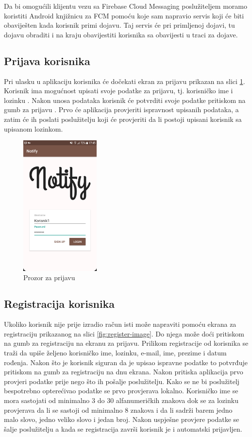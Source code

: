 \documentclass[times, utf8, zavrsni]{fer}
\begin{document}
{Da bi omogućili klijentu vezu sa Firebase Cloud Messaging poslužiteljem moramo koristiti Android knjižnicu za FCM pomoću koje sam napravio servis koji će biti obaviješten kada korisnik primi dojavu. Taj servis će pri primljenoj dojavi, tu dojavu obraditi i na kraju obavijestiti korisnika sa obavijesti u traci za dojave.

\subsection{Prijava korisnika}
Pri ulasku u aplikaciju korisnika će dočekati ekran za prijavu prikazan na slici \ref{fig:login-image}. Korisnik ima mogućnost upisati svoje podatke za prijavu, tj. korisničko ime  i lozinku . Nakon unosa podataka korisnik će potvrditi svoje podatke pritiskom na gumb za prijavu . Prvo će aplikacija provjeriti ispravnost upisanih podataka, a zatim će ih poslati poslužitelju koji će provjeriti da li postoji upisani korisnik sa upisanom lozinkom.

\begin{figure}[htb]
\centering
\includegraphics[width=4cm]{img/ss-login.png}
\caption{Prozor za prijavu}
\label{fig:login-image}
\end{figure}

\subsection{Registracija korisnika}
Ukoliko korisnik nije prije izradio račun isti može napraviti pomoću ekrana za registraciju prikazanog na slici \ref{fig:register-image}. Do njega može doći pritiskom na gumb za registraciju  na ekranu za prijavu. Prilikom registracije od korisnika se traži da upiše željeno korisničko ime, lozinku, e-mail, ime, prezime i datum rođenja. Nakon što je korisnik siguran da je upisao ispravne podatke to potvrđuje pritiskom na gumb za registraciju na dnu ekrana. Nakon pritiska aplikacija prvo provjeri podatke prije nego što ih pošalje poslužitelju. Kako se ne bi poslužitelj bespotrebno opterećivao podatke se prvo provjerava lokalno. Korisničko ime se mora sastojati od minimalno 3 do 30 alfanumeričkih znakova dok se za lozinku provjerava da li se sastoji od minimalno 8 znakova i da li sadrži barem jedno malo slovo, jedno veliko slovo i jedan broj. Nakon uspješne provjere podatke se šalje poslužitelju a kada se registracija završi korisnik je i automatski prijavljen.

}
\end{document}

